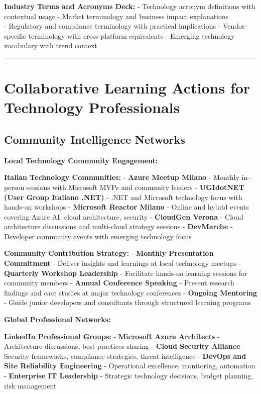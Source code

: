 \documentclass[
  letterpaper,
  DIV=11,
  numbers=noendperiod]{scrartcl}
\begin{document}
\textbf{Industry Terms and Acronyms Deck:} - Technology acronym
definitions with contextual usage - Market terminology and business
impact explanations\\
- Regulatory and compliance terminology with practical implications -
Vendor-specific terminology with cross-platform equivalents - Emerging
technology vocabulary with trend context

\begin{center}\rule{0.5\linewidth}{0.5pt}\end{center}

\section{Collaborative Learning Actions for Technology
Professionals}\label{collaborative-learning-actions-for-technology-professionals}

\subsection{Community Intelligence
Networks}\label{community-intelligence-networks}

\textbf{Local Technology Community Engagement:}

\textbf{Italian Technology Communities:} - \textbf{Azure Meetup Milano}
- Monthly in-person sessions with Microsoft MVPs and community leaders -
\textbf{UGIdotNET (User Group Italiano .NET)} - .NET and Microsoft
technology focus with hands-on workshops - \textbf{Microsoft Reactor
Milano} - Online and hybrid events covering Azure AI, cloud
architecture, security - \textbf{CloudGen Verona} - Cloud architecture
discussions and multi-cloud strategy sessions - \textbf{DevMarche} -
Developer community events with emerging technology focus

\textbf{Community Contribution Strategy:} - \textbf{Monthly Presentation
Commitment} - Deliver insights and learnings at local technology meetups
- \textbf{Quarterly Workshop Leadership} - Facilitate hands-on learning
sessions for community members - \textbf{Annual Conference Speaking} -
Present research findings and case studies at major technology
conferences - \textbf{Ongoing Mentoring} - Guide junior developers and
consultants through structured learning programs

\textbf{Global Professional Networks:}

\textbf{LinkedIn Professional Groups:} - \textbf{Microsoft Azure
Architects} - Architecture discussions, best practices sharing -
\textbf{Cloud Security Alliance} - Security frameworks, compliance
strategies, threat intelligence - \textbf{DevOps and Site Reliability
Engineering} - Operational excellence, monitoring, automation -
\textbf{Enterprise IT Leadership} - Strategic technology decisions,
budget planning, risk management
\end{document}
